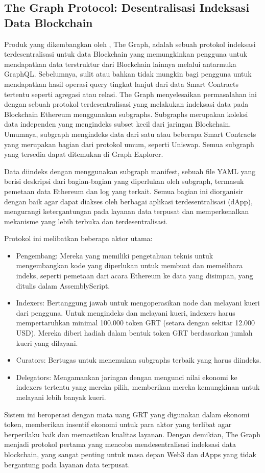\subsection{The Graph Protocol: Desentralisasi Indeksasi Data Blockchain}
\label{subsec:the-graph-protocol}

Produk yang dikembangkan oleh \cite{TheGraphDocs}, The Graph, adalah sebuah protokol indeksasi terdesentralisasi untuk data Blockchain yang memungkinkan pengguna untuk mendapatkan data terstruktur dari Blockchain lainnya melalui antarmuka GraphQL. Sebelumnya, sulit atau bahkan tidak mungkin bagi pengguna untuk mendapatkan hasil operasi query tingkat lanjut dari data Smart Contracts tertentu seperti agregasi atau relasi. The Graph menyelesaikan permasalahan ini dengan sebuah protokol terdesentralisasi yang melakukan indeksasi data pada Blockchain Ethereum menggunakan subgraphs. Subgraphs merupakan koleksi data independen yang mengindeks subset kecil dari jaringan Blockchain. Umumnya, subgraph mengindeks data dari satu atau beberapa Smart Contracts yang merupakan bagian dari protokol umum, seperti Uniswap. Semua subgraph yang tersedia dapat ditemukan di Graph Explorer.

Data diindeks dengan menggunakan subgraph manifest, sebuah file YAML yang berisi deskripsi dari bagian-bagian yang diperlukan oleh subgraph, termasuk pemetaan data Ethereum dan log yang terkait. Semua bagian ini diorganisir dengan baik agar dapat diakses oleh berbagai aplikasi terdesentralisasi (dApp), mengurangi ketergantungan pada layanan data terpusat dan memperkenalkan mekanisme yang lebih terbuka dan terdesentralisasi.

Protokol ini melibatkan beberapa aktor utama:

\begin{itemize}
  \item Pengembang: Mereka yang memiliki pengetahuan teknis untuk mengembangkan kode yang diperlukan untuk membuat dan memelihara indeks, seperti pemetaan dari acara Ethereum ke data yang disimpan, yang ditulis dalam AssemblyScript.
  \item Indexers: Bertanggung jawab untuk mengoperasikan node dan melayani kueri dari pengguna. Untuk mengindeks dan melayani kueri, indexers harus mempertaruhkan minimal 100.000 token GRT (setara dengan sekitar 12.000 USD). Mereka diberi hadiah dalam bentuk token GRT berdasarkan jumlah kueri yang dilayani.
  \item Curators: Bertugas untuk menemukan subgraphs terbaik yang harus diindeks.
  \item Delegators: Mengamankan jaringan dengan mengunci nilai ekonomi ke indexers tertentu yang mereka pilih, memberikan mereka kemungkinan untuk melayani lebih banyak kueri.
\end{itemize}

Sistem ini beroperasi dengan mata uang GRT yang digunakan dalam ekonomi token, memberikan insentif ekonomi untuk para aktor yang terlibat agar berperilaku baik dan memastikan kualitas layanan. Dengan demikian, The Graph menjadi protokol pertama yang mencoba mendesentralisasi indeksasi data blockchain, yang sangat penting untuk masa depan Web3 dan dApps yang tidak bergantung pada layanan data terpusat.